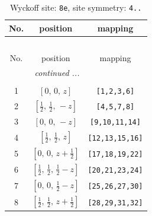 \documentclass[fleqn,8pt]{jsarticle}
\begin{document}
\renewcommand{\arraystretch}{1.2}
\begin{longtable}{ccc}
\caption{Wyckoff site: {\tt 8e}, site symmetry: {\tt 4..}}
 \\
 \hline \hline
No. & position & mapping \\ \hline \endfirsthead

\multicolumn{2}{l}{\tablename\ \thetable{}} \\
 \hline \hline
No. & position & mapping \\ \hline \endhead

 \hline \hline
\multicolumn{2}{r}{\footnotesize\it continued ...} \\ \endfoot

 \hline \hline
\multicolumn{2}{r}{} \\ \endlastfoot

1 & $\left[ 0,\, 0,\, z \right]$ & {\tt [1,2,3,6]} \\ \hline
2 & $\left[ \frac{1}{2},\, \frac{1}{2},\, - z \right]$ & {\tt [4,5,7,8]} \\ \hline
3 & $\left[ 0,\, 0,\, - z \right]$ & {\tt [9,10,11,14]} \\ \hline
4 & $\left[ \frac{1}{2},\, \frac{1}{2},\, z \right]$ & {\tt [12,13,15,16]} \\ \hline
5 & $\left[ 0,\, 0,\, z + \frac{1}{2} \right]$ & {\tt [17,18,19,22]} \\ \hline
6 & $\left[ \frac{1}{2},\, \frac{1}{2},\, \frac{1}{2} - z \right]$ & {\tt [20,21,23,24]} \\ \hline
7 & $\left[ 0,\, 0,\, \frac{1}{2} - z \right]$ & {\tt [25,26,27,30]} \\ \hline
8 & $\left[ \frac{1}{2},\, \frac{1}{2},\, z + \frac{1}{2} \right]$ & {\tt [28,29,31,32]} \\
\end{longtable}
\renewcommand{\arraystretch}{1.2}
\end{document}

